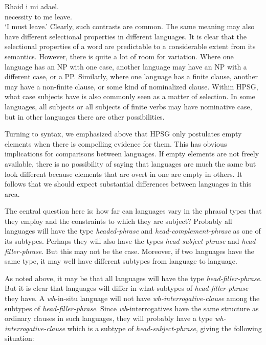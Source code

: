 \documentclass[output=paper]{langsci/langscibook}
\begin{document}
\ea\label{ex:key:4.15}
    \sn\gll Rhaid i mi adael.\\
            necessity to me leave.\Inf{}\\
    \glt    \enquote*{I must leave.}
\z
%
Clearly, such contrasts are common. The same meaning may also have different
selectional properties in different languages. It is clear that the selectional
properties of a word are predictable to a considerable extent from its
semantics. However, there is quite a lot of room for variation. Where one
language has an NP with one case, another language may have an NP with a
different case, or a PP. Similarly, where one language has a finite clause,
another may have a non-finite clause, or some kind of nominalized clause.
Within \gls{HPSG}, what case subjects have is also commonly seen as a matter of
selection. In some languages, all subjects or all subjects of finite verbs may
have nominative case, but in other languages there are other possibilities.

Turning to syntax, we emphasized above that \gls{HPSG} only postulates empty elements
when there is compelling evidence for them. This has obvious implications for
comparisons between languages. If empty elements are not freely available,
there is no possibility of saying that languages are much the same but look
different because elements that are overt in one are empty in others. It
follows that we should expect substantial differences between languages in this
area.

The central question here is: how far can languages vary in the phrasal types
that they employ and the constraints to which they are subject? Probably all
languages will have the type \emph{headed-phrase} and
\emph{head-complement-phrase} as one of its subtypes. Perhaps they will also
have the types \emph{head-subject-phrase} and \emph{head-filler-phrase}. But
this may not be the case. Moreover, if two languages have the same type, it may
well have different subtypes from language to language.

As noted above, it may be that all languages will have the type
\emph{head-filler-phrase}. But it is clear that languages will differ in what
subtypes of \emph{head-filler-phrase} they have. A \emph{wh}-in-situ language
will not have \emph{wh-interrogative-clause} among the subtypes of
\emph{head-filler-phrase}. Since \emph{wh}-interrogatives have the same
structure as ordinary clauses in such languages, they will probably have a type
\emph{wh-interrogative-clause} which is a subtype of
\emph{head-subject-phrase}, giving the following situation:
\end{document}
